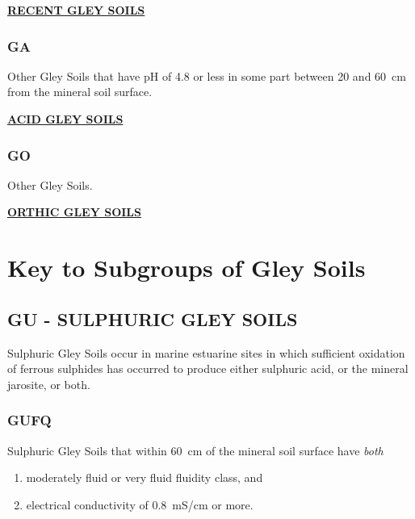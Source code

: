 \documentclass[
  letterpaper,
  DIV=11,
  numbers=noendperiod]{scrreprt}
\providecommand{\tightlist}{%
  \setlength{\itemsep}{0pt}\setlength{\parskip}{0pt}}\usepackage{longtable,booktabs,array}
\begin{document}
\protect\hyperlink{sec-GR}{\textbf{RECENT GLEY SOILS}}

\hypertarget{sec-key-GA}{%
\subsubsection{\texorpdfstring{\textbf{GA}}{GA}}\label{sec-key-GA}}

Other Gley Soils that have pH of 4.8 or less in some part between 20 and
60~cm from the mineral soil surface.

\protect\hyperlink{sec-GA}{\textbf{ACID GLEY SOILS}}

\hypertarget{sec-key-GO}{%
\subsubsection{\texorpdfstring{\textbf{GO}}{GO}}\label{sec-key-GO}}

Other Gley Soils.

\protect\hyperlink{sec-GO}{\textbf{ORTHIC GLEY SOILS}}

\hypertarget{sec-sub-G}{%
\section{Key to Subgroups of Gley Soils}\label{sec-sub-G}}

\hypertarget{sec-GU}{%
\subsection{\texorpdfstring{\textbf{GU} - SULPHURIC GLEY
SOILS}{GU - SULPHURIC GLEY SOILS}}\label{sec-GU}}

Sulphuric Gley Soils occur in marine estuarine sites in which sufficient
oxidation of ferrous sulphides has occurred to produce either sulphuric
acid, or the mineral jarosite, or both.

\hypertarget{sec-key-GUFQ}{%
\subsubsection{\texorpdfstring{\textbf{GUFQ}}{GUFQ}}\label{sec-key-GUFQ}}

Sulphuric Gley Soils that within 60~cm of the mineral soil surface have
\emph{both}

\begin{enumerate}
\def\labelenumi{\arabic{enumi}.}
\tightlist
\item
  moderately fluid or very fluid fluidity class, and
\item
  electrical conductivity of 0.8~mS/cm or more.
\end{enumerate}
\end{document}
